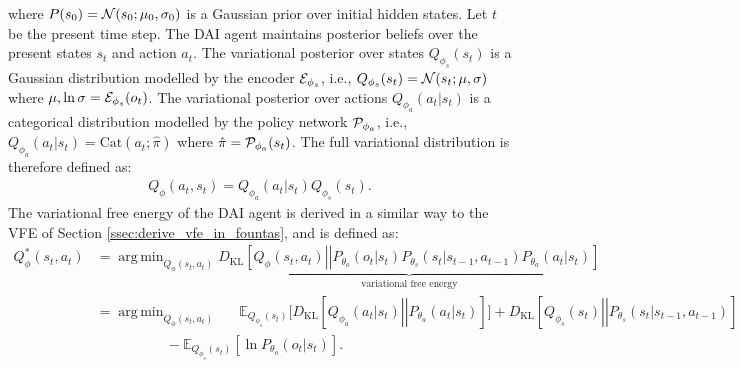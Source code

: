 \documentclass[twoside,11pt]{article}
\let\oldmathcal\mathcal
\renewcommand{\mathcal}[1]{%
  \IfSubStr{ABCDEFGHIJKLMNOPQRSTUVWXYZ}{#1}{\oldmathcal{#1}}{\mathdutchcal{#1}}
}
\newcommand{\kl}[2]{D_{\mathrm{KL}} \left[ \left. \left. #1 \right|\right| #2 \right] }
\DeclareMathOperator*{\argmin}{arg\,min}
\begin{document}
where $P(s_0) = \mathcal{N}(s_0;\mu_0,\sigma_0)$ is a Gaussian prior over initial hidden states. Let $t$ be the present time step. The DAI agent maintains posterior beliefs over the present states $s_t$ and action $a_t$. The variational posterior over states $Q_{\phi_s}(s_t)$ is a Gaussian distribution modelled by the encoder $\mathcal{E}_{\phi_s}$, i.e., $Q_{\phi_s}(s_t) = \mathcal{N}(s_t;\mu, \sigma)$ where $\mu, \ln\sigma = \mathcal{E}_{\phi_s}(o_t)$. The variational posterior over actions $Q_{\phi_a}(a_t|s_t)$ is a categorical distribution modelled by the policy network $\mathcal{P}_{\phi_a}$, i.e., $Q_{\phi_a}(a_t|s_t) = \text{Cat}(a_t;\hat{\pi})$ where $\hat{\pi} = \mathcal{P}_{\phi_a}(s_t)$. The full variational distribution is therefore defined as:
\begin{align*}
Q_{\phi}(a_t,s_t) = Q_{\phi_a}(a_t|s_t)Q_{\phi_s}(s_t).
\end{align*}
The variational free energy of the DAI agent is derived in a similar way to the VFE of Section \ref{ssec:derive_vfe_in_fountas}, and is defined as:
\begin{align}
Q^*_{\phi}(s_t, a_t) &= \argmin_{Q_{\phi}(s_t, a_t)}\underbrace{\kl{Q_{\phi}(s_t, a_t)}{P_{\theta_o}(o_t|s_t)P_{\theta_s}(s_t|s_{t-1},a_{t-1})P_{\theta_a}(a_t|s_t)}}_{\text{variational free energy}}\label{eq:vfe_defi_dai}\\
&= \argmin_{Q_{\phi}(s_t, a_t)} \quad\,\,\, \mathbb{E}_{Q_{\phi_s}(s_t)}\big[\kl{Q_{\phi_a}(a_t|s_t)}{P_{\theta_a}(a_t|s_t)}\big] + \kl{Q_{\phi_s}(s_t)}{P_{\theta_s}(s_t|s_{t-1},a_{t-1})}\nonumber\\
&\quad\qquad\qquad - \mathbb{E}_{Q_{\phi_s}(s_t)}[\ln P_{\theta_o}(o_t|s_t)].\nonumber
\end{align}
\end{document}
